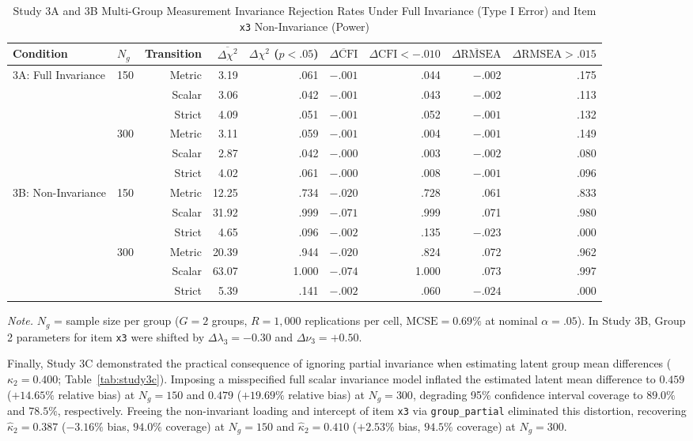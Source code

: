 ﻿\documentclass[12pt,letterpaper]{article}
\begin{document}
\begin{table}[htbp]
\centering
\caption{Study 3A and 3B Multi-Group Measurement Invariance Rejection Rates Under Full Invariance (Type I Error) and Item \texttt{x3} Non-Invariance (Power)}
\label{tab:study3ab}
\footnotesize
\setlength{\tabcolsep}{4.5pt}
\begin{tabular}{llrrrrrrr}
\toprule
Condition & $N_g$ & Transition & $\overline{\Delta\chi^2}$ & $\Delta\chi^2$ ($p < .05$) & $\overline{\Delta\mathrm{CFI}}$ & $\Delta\mathrm{CFI} < -.010$ & $\overline{\Delta\mathrm{RMSEA}}$ & $\Delta\mathrm{RMSEA} > .015$ \\
\midrule
3A: Full Invariance & 150 & Metric & 3.19 & .061 & $-.001$ & .044 & $-.002$ & .175 \\
 & & Scalar & 3.06 & .042 & $-.001$ & .043 & $-.002$ & .113 \\
 & & Strict & 4.09 & .051 & $-.001$ & .052 & $-.001$ & .132 \\
 & 300 & Metric & 3.11 & .059 & $-.001$ & .004 & $-.001$ & .149 \\
 & & Scalar & 2.87 & .042 & $-.000$ & .003 & $-.002$ & .080 \\
 & & Strict & 4.02 & .061 & $-.000$ & .008 & $-.001$ & .096 \\
\addlinespace
3B: Non-Invariance & 150 & Metric & 12.25 & .734 & $-.020$ & .728 & .061 & .833 \\
 & & Scalar & 31.92 & .999 & $-.071$ & .999 & .071 & .980 \\
 & & Strict & 4.65 & .096 & $-.002$ & .135 & $-.023$ & .000 \\
 & 300 & Metric & 20.39 & .944 & $-.020$ & .824 & .072 & .962 \\
 & & Scalar & 63.07 & 1.000 & $-.074$ & 1.000 & .073 & .997 \\
 & & Strict & 5.39 & .141 & $-.002$ & .060 & $-.024$ & .000 \\
\bottomrule
\end{tabular}
\vspace{4pt}
\par\noindent\footnotesize\textit{Note.} $N_g$ = sample size per group ($G = 2$ groups, $R = 1{,}000$ replications per cell, $\mathrm{MCSE} = 0.69\%$ at nominal $\alpha = .05$). In Study 3B, Group 2 parameters for item \texttt{x3} were shifted by $\Delta\lambda_3 = -0.30$ and $\Delta\nu_3 = +0.50$.
\end{table}

Finally, Study 3C demonstrated the practical consequence of ignoring partial invariance when estimating latent group mean differences ($\kappa_2 = 0.400$; Table~\ref{tab:study3c}). Imposing a misspecified full scalar invariance model inflated the estimated latent mean difference to $0.459$ ($+14.65\%$ relative bias) at $N_g = 150$ and $0.479$ ($+19.69\%$ relative bias) at $N_g = 300$, degrading 95\% confidence interval coverage to $89.0\%$ and $78.5\%$, respectively. Freeing the non-invariant loading and intercept of item \texttt{x3} via \texttt{group\_partial} eliminated this distortion, recovering $\hat{\kappa}_2 = 0.387$ ($-3.16\%$ bias, $94.0\%$ coverage) at $N_g = 150$ and $\hat{\kappa}_2 = 0.410$ ($+2.53\%$ bias, $94.5\%$ coverage) at $N_g = 300$.
\end{document}
